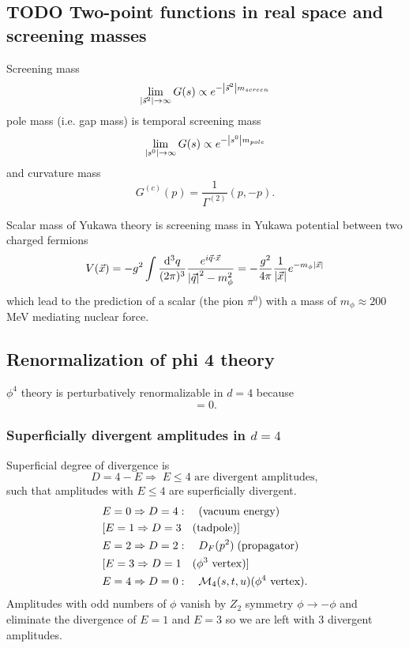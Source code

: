 \subsection{TODO Two-point functions in real space and screening masses}
\begin{mybox}{}
	Screening mass
\begin{equation}
	\lim_{\abs{\vec{s}^2}\rightarrow\infty} G(s) \propto e^{- \abs{\vec{s}^2} m_{screen}}
\end{equation}
pole mass (i.e. gap mass) is temporal screening mass
\begin{equation}
	\lim_{\abs{{s}^0} \rightarrow\infty} G(s) \propto e^{- \abs{s^0}m_{pole}}
\end{equation}
and curvature mass
\begin{equation}
G^{(c)}(p) = \frac{1}{\Gamma^{(2)}}(p,-p).
\end{equation}
\end{mybox}
Scalar mass of Yukawa theory is screening mass in Yukawa potential between two charged fermions
\begin{equation}
	V(\vec{x})= - g^2 \int \frac{\mathrm{d}^3 q}{(2 \pi)^3} \frac{e^{i\vec{q}\cdot \vec{x}}}{\abs{\vec{q}}^2-m^2_\phi} = -\frac{g^2}{4\pi} \frac{1}{\abs{\vec{x}}} e^{-m_\phi \abs{\vec{x}}}
\end{equation}
which lead to the prediction of a scalar (the pion $\pi^0$) with a mass of $m_\phi \approx 200$ MeV mediating nuclear force.
\subsection{Renormalization of phi 4 theory}
$\phi^4$ theory is perturbatively renormalizable in $d=4$ because 
\begin{equation}
[\lambda]=0.
\end{equation}
\subsubsection{Superficially divergent amplitudes in $d=4$}
Superficial degree of divergence is 
\begin{equation}
	D=4-E \Rightarrow\; E\leq 4 \text{ are divergent amplitudes},
\end{equation}
such that amplitudes with $E\leq 4$ are superficially divergent.
\begin{align}
	&E=0 \Rightarrow D=4: \quad (\text{vacuum energy})\\
	&[E=1 \Rightarrow D=3 \quad (\text{tadpole})]\\
	&E=2 \Rightarrow D=2: \quad D_F(p^2) \; (\text{propagator})\\
	&[E=3 \Rightarrow D=1 \quad (\phi^3 \text{ vertex})]\\
	&E=4 \Rightarrow D=0: \quad \mathcal{M}_4(s,t,u) (\phi^4 \text{ vertex}).
\end{align}
Amplitudes with odd numbers of $\phi$ vanish by $Z_2$ symmetry $\phi \rightarrow - \phi$ and eliminate the divergence of $E=1$ and $E=3$ so we are left with $3$ divergent amplitudes.
